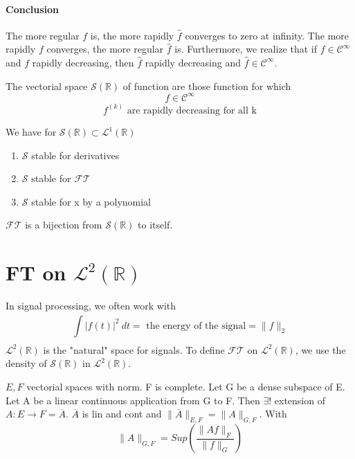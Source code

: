\subsubsection{Conclusion }
The more regular $ f  $ is, the more rapidly $ \widehat{f}  $ converges to zero at
infinity. The more rapidly $ f $ converges, the more regular $ \widehat{f} $ is. 
Furthermore, we realize that if $ f \in \mathscr{ C } ^{\infty}  $ and $ f  $ rapidly
decreasing, then $ \widehat{f}  $ rapidly decreasing and $ \widehat{f} \in \mathscr{ C }
^{\infty}   $. 

\begin{defn}
    The vectorial space $ \mathscr{ S } \left( \mathbb{R}\right)  $ of function are those
    function for which 
    \[
     f \in \mathscr{ C } _{  }^{ \infty }  
    \]
    \[
     f _{  }^{ (k)  } \text{ are rapidly decreasing for all k}  
    \]
    \label{def:Schwartz Space}
\end{defn}

We have for $ \mathscr{ S } \left( \mathbb{R}\right) \subset \mathscr{L}^1\left( \mathbb{R}\right)   $
\begin{enumerate}
    \item $ \mathscr{ S }  $ stable for derivatives 
    \item $ \mathscr{ S }  $ stable for $ \mathscr{ FT }  $
    \item $ \mathscr{ S }  $ stable for x by a polynomial 
\end{enumerate}

$ \mathscr{ FT }  $ is a bijection from $ \mathscr{ S } \left( \mathbb{R}\right)  $ to
itself. 

\chapter{FT on $ \mathscr{L}^2(\mathbb{R} )    $}
In signal processing, we often work with 
\[
\int\limits_{ }^{ } \left | f(t)  \right | ^2 \ dt = \text{ the energy of the signal} =
\|f\|_{2} 
\]
$ \mathscr{L}^2(\mathbb{R})  $ is the "natural" space for signals. To define $ \mathscr{
FT }  $ on $ \mathscr{L}^2(\mathbb{R})  $, we use the density of $ \mathscr{ S } \left(
\mathbb{R}\right)  $ in $ \mathscr{L}^2(\mathbb{R})  $.
\begin{ftheo}
    $ E, F $ vectorial spaces with norm. F is complete. Let G be a dense subspace of E.
    Let A be a linear continuous application from G to F. Then $ \exists ! $ extension of
    $ A : E \to F  = \overline{A} $. $ \overline{A} $ is lin and cont and $ \|
    \overline{A} \|^{ }_{ E, F} = \| A \|^{ }_{ G, F}  $. With 
    \[
    \| A \|^{ }_{ G, F} = Sup \left( \frac{ \| A f \|^{ }_{ F}  }{ \| f \|^{ }_{ G}  } \right) 
    \]
    \label{th:Extension Theorem}
\end{ftheo}


